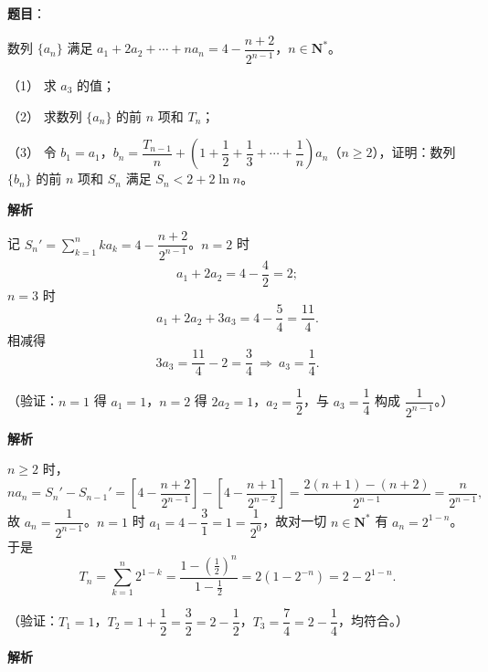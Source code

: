 \begin{answer}

\textbf{题目}：

数列 \(\{a_n\}\) 满足 \(a_1+2a_2+\cdots+na_n=4-\dfrac{n+2}{2^{n-1}}\)，\(n\in\mathbf{N}^*\)。

（1） 求 \(a_3\) 的值；

（2） 求数列 \(\{a_n\}\) 的前 \(n\) 项和 \(T_n\)；

（3） 令 \(b_1=a_1\)，\(b_n=\dfrac{T_{n-1}}{n}+\left(1+\dfrac{1}{2}+\dfrac{1}{3}+\cdots+\dfrac{1}{n}\right)a_n\)（\(n\geqslant2\)），证明：数列 \(\{b_n\}\) 的前 \(n\) 项和 \(S_n\) 满足 \(S_n<2+2\ln n\)。

\textbf{解析}


记 \(S_n'=\sum_{k=1}^{n}ka_k=4-\dfrac{n+2}{2^{n-1}}\)。\(n=2\) 时
\nopagebreak[4]
\[
a_1+2a_2=4-\frac42=2;
\]
\(n=3\) 时
\nopagebreak[4]
\[
a_1+2a_2+3a_3=4-\frac54=\frac{11}{4}.
\]
相减得
\nopagebreak[4]
\[
3a_3=\frac{11}{4}-2=\frac34
\ \Longrightarrow\ a_3=\frac14.
\]

（验证：\(n=1\) 得 \(a_1=1\)，\(n=2\) 得 \(2a_2=1\)，\(a_2=\dfrac12\)，与 \(a_3=\dfrac14\) 构成 \(\dfrac1{2^{n-1}}\)。）


\textbf{解析}

\(n\geqslant2\) 时，
\nopagebreak[4]
\[
na_n=S_n'-S_{n-1}'
=\left[4-\frac{n+2}{2^{n-1}}\right]-\left[4-\frac{n+1}{2^{n-2}}\right]
=\frac{2(n+1)-(n+2)}{2^{n-1}}=\frac{n}{2^{n-1}},
\]
故 \(a_n=\dfrac1{2^{n-1}}\)。\(n=1\) 时 \(a_1=4-\dfrac31=1=\dfrac1{2^0}\)，故对一切 \(n\in\mathbf{N}^*\) 有 \(a_n=2^{1-n}\)。于是
\nopagebreak[4]
\[
T_n=\sum_{k=1}^{n}2^{1-k}
=\frac{1-\left(\frac12\right)^n}{1-\frac12}
=2\left(1-2^{-n}\right)=2-2^{1-n}.
\]

（验证：\(T_1=1\)，\(T_2=1+\dfrac12=\dfrac32=2-\dfrac12\)，\(T_3=\dfrac74=2-\dfrac14\)，均符合。）


\textbf{解析}


\end{answer}
